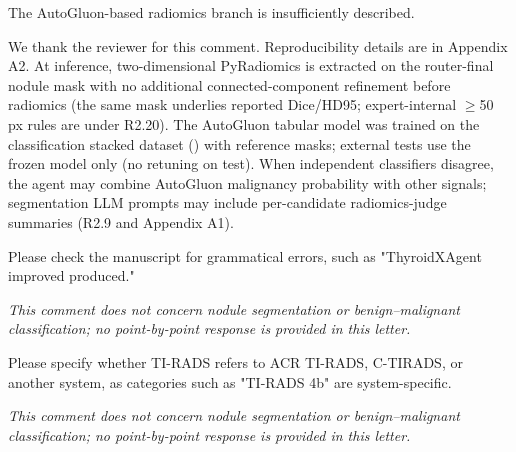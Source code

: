 \begin{reviewercomment}
The AutoGluon-based radiomics branch is insufficiently described.
\end{reviewercomment}
\begin{authorresponse}
We thank the reviewer for this comment. Reproducibility details are in Appendix A2. At inference, two-dimensional PyRadiomics is extracted on the router-final nodule mask with no additional connected-component refinement before radiomics (the same mask underlies reported Dice/HD95; expert-internal $\geq$50 px rules are under R2.20). The AutoGluon tabular model was trained on the classification stacked dataset () with reference masks; external tests use the frozen model only (no retuning on test). When independent classifiers disagree, the agent may combine AutoGluon malignancy probability with other signals; segmentation LLM prompts may include per-candidate radiomics-judge summaries (R2.9 and Appendix A1).\par
\par
\end{authorresponse}

\begin{reviewercomment}
Please check the manuscript for grammatical errors, such as "ThyroidXAgent improved produced."
\end{reviewercomment}
\begin{authorresponse}
\noindent\textit{This comment does not concern nodule segmentation or benign--malignant classification; no point-by-point response is provided in this letter.}
\end{authorresponse}

\begin{reviewercomment}
Please specify whether TI-RADS refers to ACR TI-RADS, C-TIRADS, or another system, as categories such as "TI-RADS 4b" are system-specific.
\end{reviewercomment}
\begin{authorresponse}
\noindent\textit{This comment does not concern nodule segmentation or benign--malignant classification; no point-by-point response is provided in this letter.}
\end{authorresponse}

